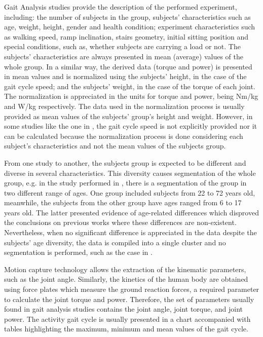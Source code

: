 Gait Analysis studies provide the description of the performed experiment, including: the number of subjects in the group, subjects' characteristics such as age, weight, height, gender and health condition; experiment characteristics such as walking speed, ramp inclination, stairs geometry, initial sitting position and special conditions, such as, whether subjects are carrying a load or not. The subjects' characteristics are always presented in mean (average) values of the whole group. In a similar way, the derived data (torque and power) is presented in mean values and is normalized using the subjects' height, in the case of the gait cycle speed; and the subjects' weight, in the case of the torque of each joint. The normalization is appreciated in the units for torque and power, being Nm/kg and W/kg respectively. The data used in the normalization process is usually provided as mean values of the subjects' group's height and weight. However, in some studies like the one in \cite{lee2008biomechanics}, the gait cycle speed is not explicitly provided nor it can be calculated because the normalization process is done considering each subject's characteristics and not the mean values of the subjects group. 

From one study to another, the subjects group is expected to be different and diverse in several characteristics. This diversity causes segmentation of the whole group, e.g. in the study performed in \cite{bovi2011multiple}, there is a segmentation of the group in two different range of ages. One group included subjects from 22 to 72 years old, meanwhile, the subjects from the other group have ages ranged from 6 to 17 years old. The latter presented evidence of age-related differences which disproved the conclusions on previous works where these differences are non-existent. Nevertheless, when no significant difference is appreciated in the data despite the subjects' age diversity, the data is compiled into a single cluster and no segmentation is performed, such as the case in \cite{lee2008biomechanics}.

Motion capture technology allows the extraction of the kinematic parameters, such as the joint angle. Similarly, the kinetics of the human body are obtained using force plates which measure the ground reaction forces, a required parameter to calculate the joint torque and power. Therefore, the set of parameters usually found in gait analysis studies contains the joint angle, joint torque, and joint power. The activity gait cycle is usually presented in a chart accompanied with tables highlighting the maximum, minimum and mean values of the gait cycle. 

